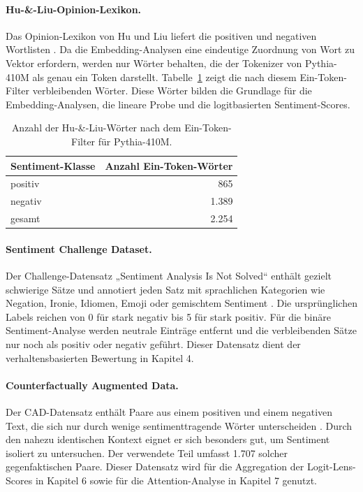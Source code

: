 \paragraph{Hu-\&-Liu-Opinion-Lexikon.}
Das Opinion-Lexikon von Hu und Liu liefert die positiven und negativen Wortlisten \cite{hu2004mining}. Da die Embedding-Analysen eine eindeutige Zuordnung von Wort zu Vektor erfordern, werden nur Wörter behalten, die der Tokenizer von Pythia-410M als genau ein Token darstellt. Tabelle~\ref{tab:hulius} zeigt die nach diesem Ein-Token-Filter verbleibenden Wörter. Diese Wörter bilden die Grundlage für die Embedding-Analysen, die lineare Probe und die logitbasierten Sentiment-Scores.

\begin{table}[htbp]
  \centering
  \caption{Anzahl der Hu-\&-Liu-Wörter nach dem Ein-Token-Filter für Pythia-410M.}
  \label{tab:hulius}
  \begin{tabular}{lr}
    \toprule
    Sentiment-Klasse & Anzahl Ein-Token-Wörter \\
    \midrule
    positiv & 865 \\
    negativ & 1.389 \\
    \midrule
    gesamt & 2.254 \\
    \bottomrule
  \end{tabular}
\end{table}

\paragraph{Sentiment Challenge Dataset.}
Der Challenge-Datensatz „Sentiment Analysis Is Not Solved“ enthält gezielt schwierige Sätze und annotiert jeden Satz mit sprachlichen Kategorien wie Negation, Ironie, Idiomen, Emoji oder gemischtem Sentiment \cite{barnes2019sentiment}. Die ursprünglichen Labels reichen von 0 für stark negativ bis 5 für stark positiv. Für die binäre Sentiment-Analyse werden neutrale Einträge entfernt und die verbleibenden Sätze nur noch als positiv oder negativ geführt. Dieser Datensatz dient der verhaltensbasierten Bewertung in Kapitel 4.

\paragraph{Counterfactually Augmented Data.}
Der CAD-Datensatz enthält Paare aus einem positiven und einem negativen Text, die sich nur durch wenige sentimenttragende Wörter unterscheiden \cite{kaushik2020learning}. Durch den nahezu identischen Kontext eignet er sich besonders gut, um Sentiment isoliert zu untersuchen. Der verwendete Teil umfasst 1.707 solcher gegenfaktischen Paare. Dieser Datensatz wird für die Aggregation der Logit-Lens-Scores in Kapitel 6 sowie für die Attention-Analyse in Kapitel 7 genutzt.


